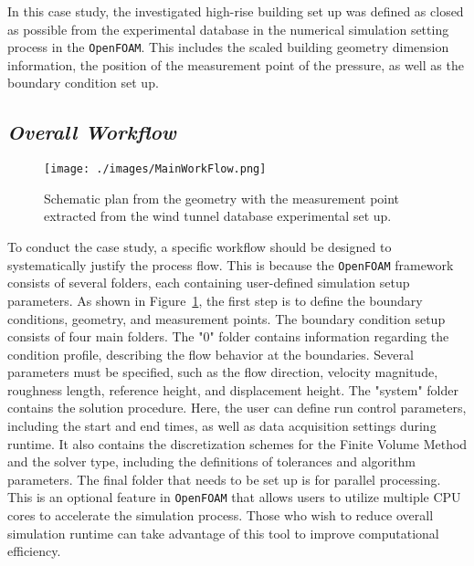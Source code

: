 \documentclass[12pt,a4paper]{cibb}
\begin{document}
In this case study, the investigated high-rise building set up was defined as closed as possible from the experimental database in the numerical simulation setting process in the \texttt{OpenFOAM}. This includes the scaled building geometry dimension information, the position of the measurement point of the pressure, as well as the boundary condition set up.

\subsection{\bf \it Overall Workflow}
\label{sec:TABLES-AND-FIGURES}

\begin{figure}[h]
\vspace{1mm}
 \begin{center}
\texttt{[image: ./images/MainWorkFlow.png]}
\caption{
Schematic plan from the geometry with the measurement point extracted from the wind tunnel database experimental set up.}
\label{fig:schematicWorkflow}
\vspace{-5mm}
\end{center}
\end{figure}

To conduct the case study, a specific workflow should be designed to systematically justify the process flow. This is because the \texttt{OpenFOAM} framework consists of several folders, each containing user-defined simulation setup parameters.
As shown in Figure~\ref{fig:schematicWorkflow}, the first step is to define the boundary conditions, geometry, and measurement points. The boundary condition setup consists of four main folders. The "0" folder contains information regarding the condition profile, describing the flow behavior at the boundaries. Several parameters must be specified, such as the flow direction, velocity magnitude, roughness length, reference height, and displacement height.
The "system" folder contains the solution procedure. Here, the user can define run control parameters, including the start and end times, as well as data acquisition settings during runtime. It also contains the discretization schemes for the Finite Volume Method and the solver type, including the definitions of tolerances and algorithm parameters.
The final folder that needs to be set up is for parallel processing. This is an optional feature in \texttt{OpenFOAM} that allows users to utilize multiple CPU cores to accelerate the simulation process. Those who wish to reduce overall simulation runtime can take advantage of this tool to improve computational efficiency.
\end{document}
